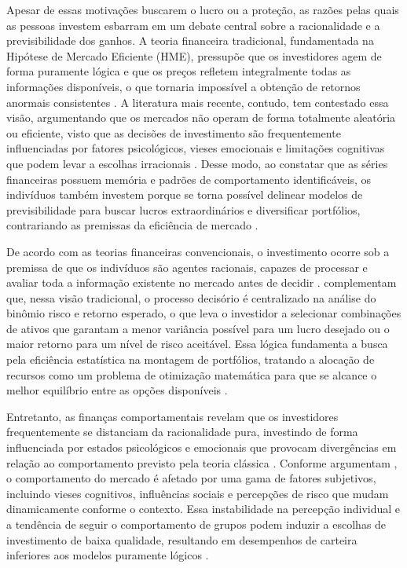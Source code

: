 Apesar de essas motivações buscarem o lucro ou a proteção, as razões pelas quais as pessoas investem esbarram em um debate central sobre a racionalidade e a previsibilidade dos ganhos. A teoria financeira tradicional, fundamentada na Hipótese de Mercado Eficiente (HME), pressupõe que os investidores agem de forma puramente lógica e que os preços refletem integralmente todas as informações disponíveis, o que tornaria impossível a obtenção de retornos anormais consistentes \cite{paiva2019decision}. A literatura mais recente, contudo, tem contestado essa visão, argumentando que os mercados não operam de forma totalmente aleatória ou eficiente, visto que as decisões de investimento são frequentemente influenciadas por fatores psicológicos, vieses emocionais e limitações cognitivas que podem levar a escolhas irracionais \cite{almansour2023behavioral}. Desse modo, ao constatar que as séries financeiras possuem memória e padrões de comportamento identificáveis, os indivíduos também investem porque se torna possível delinear modelos de previsibilidade para buscar lucros extraordinários e diversificar portfólios, contrariando as premissas da eficiência de mercado \cite{paiva2019decision,charfeddine2020investigating}.

De acordo com as teorias financeiras convencionais, o investimento ocorre sob a premissa de que os indivíduos são agentes racionais, capazes de processar e avaliar toda a informação existente no mercado antes de decidir \cite{adil2022financial}.  complementam que, nessa visão tradicional, o processo decisório é centralizado na análise do binômio risco e retorno esperado, o que leva o investidor a selecionar combinações de ativos que garantam a menor variância possível para um lucro desejado ou o maior retorno para um nível de risco aceitável. Essa lógica fundamenta a busca pela eficiência estatística na montagem de portfólios, tratando a alocação de recursos como um problema de otimização matemática para que se alcance o melhor equilíbrio entre as opções disponíveis \cite{paiva2019decision}.

Entretanto, as finanças comportamentais revelam que os investidores frequentemente se distanciam da racionalidade pura, investindo de forma influenciada por estados psicológicos e emocionais que provocam divergências em relação ao comportamento previsto pela teoria clássica \cite{adil2022financial}. Conforme argumentam , o comportamento do mercado é afetado por uma gama de fatores subjetivos, incluindo vieses cognitivos, influências sociais e percepções de risco que mudam dinamicamente conforme o contexto. Essa instabilidade na percepção individual e a tendência de seguir o comportamento de grupos podem induzir a escolhas de investimento de baixa qualidade, resultando em desempenhos de carteira inferiores aos modelos puramente lógicos \cite{almansour2023behavioral,adil2022financial}.

